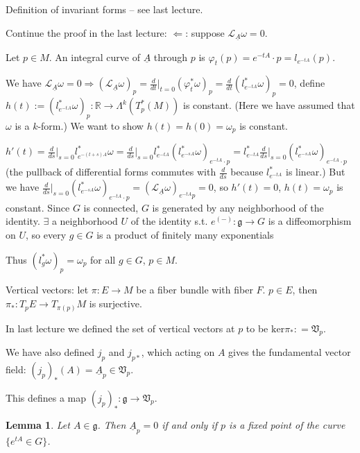 \documentclass{article}
\theoremstyle{mystyle}
\newtheorem*{lemma*}{Lemma}
\theoremstyle{remark}
\numberwithin{equation}{section}
\begin{document}
Definition of invariant forms -- see last lecture.

Continue the proof in the last lecture: $\Leftarrow$: suppose $\mathcal{L}_{\underline{A}} \omega = 0$. 

Let $p \in M$. An integral curve of $\underline{A}$ through $p$ is $\varphi_t(p) = e^{-tA}\cdot p = l_{e^{-tA}}(p)$. 

We have $\mathcal{L}_{\underline{A}} \omega = 0\Rightarrow (\mathcal{L}_{\underline{A}}\omega)_p = \frac{d}{dt}\Big|_{t=0} (\varphi_t^*\omega)_p = \frac{d}{dt} (l_{e^{-tA}}^*\omega)_p  = 0$, define $h(t):= (l_{e^{-tA}}^*\omega)_p\colon \mathbb{R} \rightarrow \Lambda^k(T_p^*(M))$ is constant. (Here we have assumed that $\omega$ is a $k$-form.) We want to show $h(t) = h(0) = \omega_p$ is constant.

$h'(t) = \frac{d}{ds}\big|_{s=0} l_{e^{-(t+s)A}}^*\omega = \frac{d}{ds}\big|_{s=0}l_{e^{-tA}}^* \left(l_{e^{-sA}}^* \omega\right)_{e^{-tA}\cdot p}
 = l_{e^{-tA}}^* \frac{d}{ds}\big|_{s=0} \left(l_{e^{-sA}}^* \omega\right)_{e^{-tA}\cdot p}$ (the pullback of differential forms commutes with $\frac{d}{ds}$ because $l_{e^{-tA}}^*$ is linear.) But we have $
 \frac{d}{ds}\big|_{s=0} \left(l_{e^{-sA}}^* \omega\right)_{e^{-tA}\cdot p}
 = (\mathcal{L}_{\underline{A}}\omega)_{e^{-tA}p}=0$, so $h'(t)=0$, $h(t) = \omega_p$ is constant. Since $G$ is connected, $G$ is generated by any neighborhood of the identity. $\exists$ a neighborhood $U$ of the identity s.t. $e^(-)\colon \mathfrak{g}\rightarrow G$ is a diffeomorphism on $U$, so every $g\in G$ is a product of finitely many exponentials

Thus $(l_g^*\omega)_p = \omega_p$ for all $g\in G$, $p\in M$. 

Vertical vectors: let $\pi\colon E\rightarrow M$ be a fiber bundle with fiber $F$. $p\in E$, then $\pi_*\colon T_pE\rightarrow T_{\pi(p)}M$ is surjective.

In last lecture we defined the set of vertical vectors at $p$ to be $\mathrm{ker}\pi_* : = \mathfrak{V}_p$.

We have also defined $j_p$ and $j_{p*}$, which acting on $A$ gives the fundamental vector field: $(j_p)_*(A) = \underline{A}_p \in \mathfrak{V}_p$. 


This defines a map $(j_p)_* \colon \mathfrak{g}\rightarrow \mathfrak{V}_p$.

\begin{lemma*} 
Let $A\in \mathfrak{g}$. Then $\underline{A}_p=0$ if and only if $p$ is a fixed point of the curve $\{e^{tA}\in G\}$. 
\end{lemma*}
\end{document}
